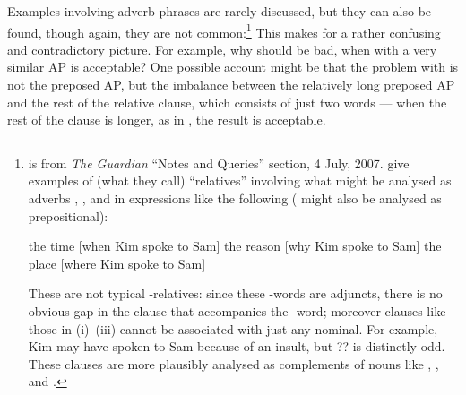 \documentclass[output=paper,biblatex,babelshorthands,newtxmath,draftmode,colorlinks,citecolor=brown]{langscibook}
\begin{document}
Examples involving adverb phrases are rarely discussed, but they can also be found, though
again, they are not common:\footnote{ is from \emph{The Guardian} ``Notes
  and Queries'' section, 4 July, 2007. \citet[1053]{Huddleston02} give examples of (what
  they call) ``relatives'' involving what might be analysed as adverbs ,
  , and  in expressions like the following ( might also be
  analysed as prepositional):
  \begin{exe}
    \ex the time [when Kim spoke to Sam]\label{x:rc-2351}
    \ex the reason [why Kim spoke to Sam]\label{x:rc-2352}
    \ex the place [where Kim spoke to Sam]\label{x:rc-2353}
  \end{exe}
  These are not typical -relatives: since these -words are adjuncts, there
  is no obvious gap in the clause that accompanies the -word; moreover clauses
  like those in (i)--(iii) cannot be associated with just any nominal. For example, Kim
  may have spoken to Sam because of an insult, but ??
  is distinctly odd. These clauses are more plausibly analysed as complements of nouns
  like , , and .}
\label{x:rc-2361} 
\z
This makes for a rather confusing and contradictory picture. For example, why should
 be bad, when  with a very similar AP is acceptable? One
possible account might be that the problem with  is not the preposed
AP, but the imbalance between the relatively long preposed AP and the rest of the relative
clause, which consists of just two words --- when the rest of the clause is longer, as in
, the result is acceptable.
\end{document}
